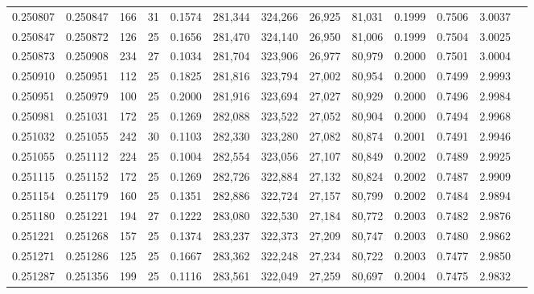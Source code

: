 \begin{tabular}{rrrrrrrrrrrrr}
0.250807 & 0.250847 &   166 &  31 &                                     0.1574 & 281,344 & 324,266 &  26,925 &  81,031 & 0.1999 & 0.7506 & 3.0037 \\
0.250847 & 0.250872 &   126 &  25 &                                     0.1656 & 281,470 & 324,140 &  26,950 &  81,006 & 0.1999 & 0.7504 & 3.0025 \\
0.250873 & 0.250908 &   234 &  27 &                                     0.1034 & 281,704 & 323,906 &  26,977 &  80,979 & 0.2000 & 0.7501 & 3.0004 \\
0.250910 & 0.250951 &   112 &  25 &                                     0.1825 & 281,816 & 323,794 &  27,002 &  80,954 & 0.2000 & 0.7499 & 2.9993 \\
0.250951 & 0.250979 &   100 &  25 &                                     0.2000 & 281,916 & 323,694 &  27,027 &  80,929 & 0.2000 & 0.7496 & 2.9984 \\
0.250981 & 0.251031 &   172 &  25 &                                     0.1269 & 282,088 & 323,522 &  27,052 &  80,904 & 0.2000 & 0.7494 & 2.9968 \\
0.251032 & 0.251055 &   242 &  30 &                                     0.1103 & 282,330 & 323,280 &  27,082 &  80,874 & 0.2001 & 0.7491 & 2.9946 \\
0.251055 & 0.251112 &   224 &  25 &                                     0.1004 & 282,554 & 323,056 &  27,107 &  80,849 & 0.2002 & 0.7489 & 2.9925 \\
0.251115 & 0.251152 &   172 &  25 &                                     0.1269 & 282,726 & 322,884 &  27,132 &  80,824 & 0.2002 & 0.7487 & 2.9909 \\
0.251154 & 0.251179 &   160 &  25 &                                     0.1351 & 282,886 & 322,724 &  27,157 &  80,799 & 0.2002 & 0.7484 & 2.9894 \\
0.251180 & 0.251221 &   194 &  27 &                                     0.1222 & 283,080 & 322,530 &  27,184 &  80,772 & 0.2003 & 0.7482 & 2.9876 \\
0.251221 & 0.251268 &   157 &  25 &                                     0.1374 & 283,237 & 322,373 &  27,209 &  80,747 & 0.2003 & 0.7480 & 2.9862 \\
0.251271 & 0.251286 &   125 &  25 &                                     0.1667 & 283,362 & 322,248 &  27,234 &  80,722 & 0.2003 & 0.7477 & 2.9850 \\
0.251287 & 0.251356 &   199 &  25 &                                     0.1116 & 283,561 & 322,049 &  27,259 &  80,697 & 0.2004 & 0.7475 & 2.9832 \\

\end{tabular}
